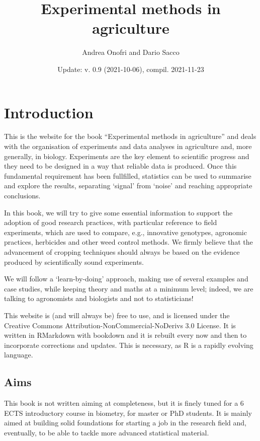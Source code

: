 \documentclass[a4paper,12pt,oneside]{book}
\author{Andrea Onofri and Dario Sacco}
\date{Update: v. 0.9 (2021-10-06), compil. 2021-11-23}
\title{Experimental methods in agriculture}
\subtitle{}
\begin{document}
\maketitle
\tableofcontents

\hypertarget{introduction}{%
\chapter*{Introduction}\label{introduction}}

This is the website for the book ``Experimental methods in agriculture'' and deals with the organisation of experiments and data analyses in agriculture and, more generally, in biology. Experiments are the key element to scientific progress and they need to be designed in a way that reliable data is produced. Once this fundamental requirement has been fullfilled, statistics can be used to summarise and explore the results, separating `signal' from `noise' and reaching appropriate conclusions.

In this book, we will try to give some essential information to support the adoption of good research practices, with particular reference to field experiments, which are used to compare, e.g., innovative genotypes, agronomic practices, herbicides and other weed control methods. We firmly believe that the advancement of cropping techniques should always be based on the evidence produced by scientifically sound experiments.

We will follow a `learn-by-doing' approach, making use of several examples and case studies, while keeping theory and maths at a minimum level; indeed, we are talking to agronomists and biologists and not to statisticians!

This website is (and will always be) free to use, and is licensed under the Creative Commons Attribution-NonCommercial-NoDerivs 3.0 License. It is written in RMarkdown with bookdown and it is rebuilt every now and then to incorporate corrections and updates. This is necessary, as R is a rapidly evolving language.

\hypertarget{aims}{%
\section*{Aims}\label{aims}}

This book is not written aiming at completeness, but it is finely tuned for a 6 ECTS introductory course in biometry, for master or PhD students. It is mainly aimed at building solid foundations for starting a job in the research field and, eventually, to be able to tackle more advanced statistical material.
\end{document}
